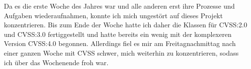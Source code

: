 Da es die erste Woche des Jahres war und alle anderen erst ihre Prozesse und Aufgaben wiederaufnahmen, konnte ich mich ungestört auf dieses Projekt konzentrieren.
Bis zum Ende der Woche hatte ich daher die Klassen für CVSS:2.0 und CVSS:3.0 fertiggestellt und hatte bereits ein wenig mit der komplexeren Version CVSS:4.0 begonnen.
Allerdings fiel es mir am Freitagnachmittag nach einer ganzen Woche mit CVSS schwer, mich weiterhin zu konzentrieren, sodass ich über das Wochenende froh war.
